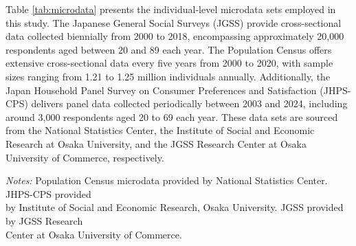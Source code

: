 \documentclass[a4paper,12pt]{article}
\begin{document}
Table \ref{tab:microdata} presents the individual-level microdata sets employed in this study. The Japanese General Social Surveys (JGSS) provide cross-sectional data collected biennially from 2000 to 2018, encompassing approximately 20,000 respondents aged between 20 and 89 each year. The Population Census offers extensive cross-sectional data every five years from 2000 to 2020, with sample sizes ranging from 1.21 to 1.25 million individuals annually. Additionally, the Japan Household Panel Survey on Consumer Preferences and Satisfaction (JHPS-CPS) delivers panel data collected periodically between 2003 and 2024, including around 3,000 respondents aged 20 to 69 each year. These data sets are sourced from the National Statistics Center, the Institute of Social and Economic Research at Osaka University, and the JGSS Research Center at Osaka University of Commerce, respectively.

\begin{table}[htbp]
    \centering
    \caption{Individual-level Microdata Sets}
    \label{tab:microdata}
    \begin{threeparttable}
    \renewcommand{\arraystretch}{1.2}
    \setlength{\tabcolsep}{8pt} %
    \small
    \begin{tablenotes}
      \footnotesize
      \item \textit{Notes:} Population Census microdata provided by National Statistics Center. JHPS-CPS provided \\ by Institute of Social and Economic Research, Osaka University. JGSS provided by JGSS Research \\ Center at Osaka University of Commerce.
    \end{tablenotes}
    \end{threeparttable}
\end{table}
\end{document}
